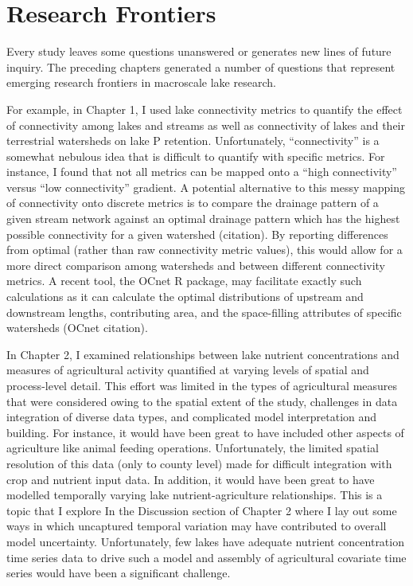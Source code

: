 \chapter*{Research Frontiers}

Every study leaves some questions unanswered or generates new lines of future inquiry. The preceding chapters generated a number of questions that represent emerging research frontiers in macroscale lake research.

For example, in Chapter 1, I used lake connectivity metrics to quantify the effect of connectivity among lakes and streams as well as connectivity of lakes and their terrestrial watersheds on lake P retention. Unfortunately, “connectivity” is a somewhat nebulous idea that is difficult to quantify with specific metrics. For instance, I found that not all metrics can be mapped onto a “high connectivity” versus “low connectivity” gradient. A potential alternative to this messy mapping of connectivity onto discrete metrics is to compare the drainage pattern of a given stream network against an optimal drainage pattern which has the highest possible connectivity for a given watershed (citation). By reporting differences from optimal (rather than raw connectivity metric values), this would allow for a more direct comparison among watersheds and between different connectivity metrics. A recent tool, the OCnet R package, may facilitate exactly such calculations as it can calculate the optimal distributions of upstream and downstream lengths, contributing area, and the space-filling attributes of specific watersheds (OCnet citation).

In Chapter 2, I examined relationships between lake nutrient concentrations and measures of agricultural activity quantified at varying levels of spatial and process-level detail. This effort was limited in the types of agricultural measures that were considered owing to the spatial extent of the study, challenges in data integration of diverse data types, and complicated model interpretation and building. For instance, it would have been great to have included other aspects of agriculture like animal feeding operations. Unfortunately, the limited spatial resolution of this data (only to county level) made for difficult integration with crop and nutrient input data. In addition, it would have been great to have modelled temporally varying lake nutrient-agriculture relationships. This is a topic that I explore In the Discussion section of Chapter 2 where I lay out some ways in which uncaptured temporal variation may have contributed to overall model uncertainty. Unfortunately, few lakes have adequate nutrient concentration time series data to drive such a model and assembly of agricultural covariate time series would have been a significant challenge.
